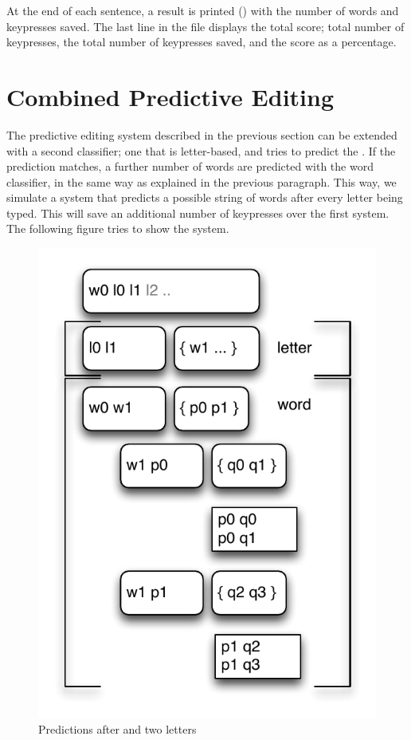 \documentclass[a4paper,10pt,twoside]{report}
\begin{document}
At the end of each sentence, a result is printed () with the number
of words and keypresses saved. The last line in the file displays the total
score; total number of keypresses, the total number of keypresses saved, and the
score as a percentage.

\section{Combined Predictive Editing}

The predictive editing system described in the previous section can be extended
with a second classifier; one that is letter-based, and tries to predict the
. If the prediction matches, a further number of
words are predicted with the word classifier, in the same way as explained in
the previous paragraph. This way, we simulate a system that predicts a possible
string of words after every letter being typed. This will save an additional
number of keypresses over the first system. The following figure tries to show
the system.

\begin{figure}[h!]
\centering
\includegraphics[width=\pdfwidth]{predit_w0l0l1.pdf}
\caption{Predictions after  and two letters}
\label{fig:predit_w0l0l1.pdf}
\end{figure}
\end{document}

